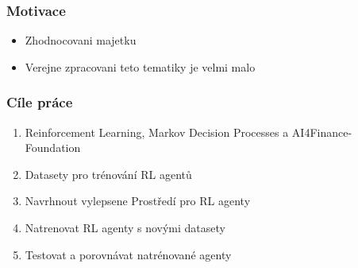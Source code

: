 




\begin{frame}
    \frametitle{Motivace}
    \begin{itemize}
        \itemsep1em
        \item Zhodnocovani majetku
        \item Verejne zpracovani teto tematiky je velmi malo
    \end{itemize}
\end{frame}

\begin{frame}
    \frametitle{Cíle práce}
    \begin{enumerate}
        \itemsep1em
        \item Reinforcement Learning, Markov Decision Processes a AI4Finance-Foundation
        \item Datasety pro trénování RL agentů
        \item Navrhnout vylepsene Prostředí pro RL agenty
        \item Natrenovat RL agenty s novými datasety
        \item Testovat a porovnávat natrénované agenty
    \end{enumerate}
\end{frame}

